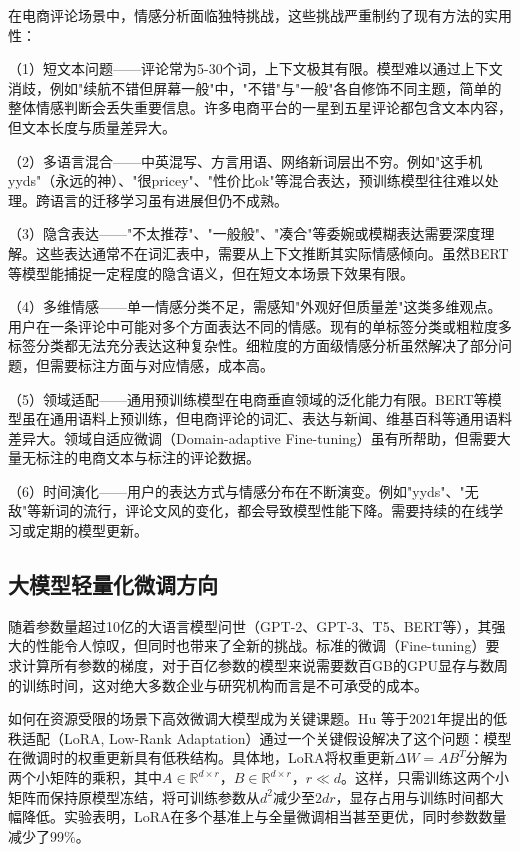 在电商评论场景中，情感分析面临独特挑战，这些挑战严重制约了现有方法的实用性：

（1）短文本问题——评论常为5-30个词，上下文极其有限。模型难以通过上下文消歧，例如"续航不错但屏幕一般"中，"不错"与"一般"各自修饰不同主题，简单的整体情感判断会丢失重要信息。许多电商平台的一星到五星评论都包含文本内容，但文本长度与质量差异大。

（2）多语言混合——中英混写、方言用语、网络新词层出不穷。例如"这手机yyds"（永远的神）、"很pricey"、"性价比ok"等混合表达，预训练模型往往难以处理。跨语言的迁移学习虽有进展但仍不成熟。

（3）隐含表达——"不太推荐"、"一般般"、"凑合"等委婉或模糊表达需要深度理解。这些表达通常不在词汇表中，需要从上下文推断其实际情感倾向。虽然BERT等模型能捕捉一定程度的隐含语义，但在短文本场景下效果有限。

（4）多维情感——单一情感分类不足，需感知"外观好但质量差"这类多维观点。用户在一条评论中可能对多个方面表达不同的情感。现有的单标签分类或粗粒度多标签分类都无法充分表达这种复杂性。细粒度的方面级情感分析虽然解决了部分问题，但需要标注方面与对应情感，成本高。

（5）领域适配——通用预训练模型在电商垂直领域的泛化能力有限。BERT等模型虽在通用语料上预训练，但电商评论的词汇、表达与新闻、维基百科等通用语料差异大。领域自适应微调（Domain-adaptive Fine-tuning）虽有所帮助，但需要大量无标注的电商文本与标注的评论数据。

（6）时间演化——用户的表达方式与情感分布在不断演变。例如"yyds"、"无敌"等新词的流行，评论文风的变化，都会导致模型性能下降。需要持续的在线学习或定期的模型更新。

\subsection{大模型轻量化微调方向}

随着参数量超过10亿的大语言模型问世（GPT-2、GPT-3、T5、BERT等），其强大的性能令人惊叹，但同时也带来了全新的挑战。标准的微调（Fine-tuning）要求计算所有参数的梯度，对于百亿参数的模型来说需要数百GB的GPU显存与数周的训练时间，这对绝大多数企业与研究机构而言是不可承受的成本。

如何在资源受限的场景下高效微调大模型成为关键课题。Hu 等于2021年提出的低秩适配（LoRA, Low-Rank Adaptation）通过一个关键假设解决了这个问题：模型在微调时的权重更新具有低秩结构。具体地，LoRA将权重更新$\Delta W = AB^T$分解为两个小矩阵的乘积，其中$A \in \mathbb{R}^{d \times r}$，$B \in \mathbb{R}^{d \times r}$，$r \ll d$。这样，只需训练这两个小矩阵而保持原模型冻结，将可训练参数从$d^2$减少至$2dr$，显存占用与训练时间都大幅降低。实验表明，LoRA在多个基准上与全量微调相当甚至更优，同时参数数量减少了99\%。

